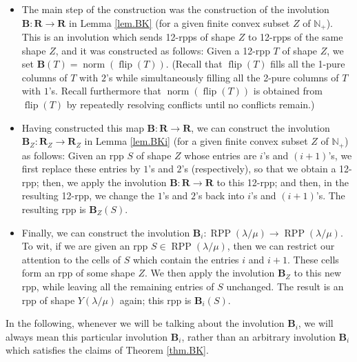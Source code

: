 \documentclass[numbers=enddot,12pt,final,onecolumn,notitlepage]{scrartcl}%
\theoremstyle{definition}
\begin{document}
\begin{itemize}
\item The main step of the construction was the construction of the involution
$\mathbf{B}:\mathbf{R}\rightarrow\mathbf{R}$ in Lemma \ref{lem.BK} (for a
given finite convex subset $Z$ of $\mathbb{N}_{+}$). This is an involution
which sends 12-rpps of shape $Z$ to 12-rpps of the same shape $Z$, and it was
constructed as follows: Given a 12-rpp $T$ of shape $Z$, we set $\mathbf{B}%
\left(  T\right)  =\operatorname*{norm}\left(  \operatorname*{flip}\left(
T\right)  \right)  $. (Recall that $\operatorname*{flip}\left(  T\right)  $
fills all the 1-pure columns of $T$ with $2$'s while simultaneously filling
all the 2-pure columns of $T$ with $1$'s. Recall furthermore that
$\operatorname*{norm}\left(  \operatorname*{flip}\left(  T\right)  \right)  $
is obtained from $\operatorname*{flip}\left(  T\right)  $ by repeatedly
resolving conflicts until no conflicts remain.)

\item Having constructed this map $\mathbf{B}:\mathbf{R}\rightarrow\mathbf{R}%
$, we can construct the involution $\mathbf{B}_{Z}:\mathbf{R}_{Z}%
\rightarrow\mathbf{R}_{Z}$ in Lemma \ref{lem.BKi} (for a given finite convex
subset $Z$ of $\mathbb{N}_{+}$) as follows: Given an rpp $S$ of shape $Z$
whose entries are $i$'s and $\left(  i+1\right)  $'s, we first replace these
entries by $1$'s and $2$'s (respectively), so that we obtain a 12-rpp; then,
we apply the involution $\mathbf{B}:\mathbf{R}\rightarrow\mathbf{R}$ to this
12-rpp; and then, in the resulting 12-rpp, we change the $1$'s and $2$'s back
into $i$'s and $\left(  i+1\right)  $'s. The resulting rpp is $\mathbf{B}%
_{Z}\left(  S\right)  $.

\item Finally, we can construct the involution $\mathbf{B}_{i}%
:\operatorname*{RPP}\left(  \lambda/\mu\right)  \rightarrow\operatorname*{RPP}%
\left(  \lambda/\mu\right)  $. To wit, if we are given an rpp $S\in
\operatorname*{RPP}\left(  \lambda/\mu\right)  $, then we can restrict our
attention to the cells of $S$ which contain the entries $i$ and $i+1$. These
cells form an rpp of some shape $Z$. We then apply the involution
$\mathbf{B}_{Z}$ to this new rpp, while leaving all the remaining entries of
$S$ unchanged. The result is an rpp of shape $Y\left(  \lambda/\mu\right)  $
again; this rpp is $\mathbf{B}_{i}\left(  S\right)  $.
\end{itemize}

In the following, whenever we will be talking about the involution
$\mathbf{B}_{i}$, we will always mean this particular involution
$\mathbf{B}_{i}$, rather than an arbitrary involution $\mathbf{B}_{i}$ which
satisfies the claims of Theorem \ref{thm.BK}.
\end{document}
